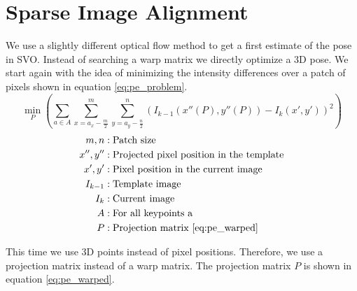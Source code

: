 \documentclass[11pt,a4paper,titlepage,oneside]{report}
\begin{document}
\section{Sparse Image Alignment}\label{sec:pose_estimation}
We use a slightly different optical flow method to get a first estimate of the pose in SVO. Instead of searching a warp matrix we directly optimize a 3D pose. We start again with the idea of minimizing the intensity differences over a patch of pixels shown in equation \ref{eq:pe_problem}.
\begin{equation}\label{eq:pe_problem}
  \min_P(\sum_{a \in A}\sum_{x=a_x-\frac{m}{2}}^m\sum_{y=a_y-\frac{n}{2}}^n(I_{k-1}(x''(P),y''(P))-I_{k}(x',y'))^2)
\end{equation}
\begin{align*}
  m,n       &: \text{Patch size}\\
  x'',y''   &: \text{Projected pixel position in the template}\\
  x',y'     &: \text{Pixel position in the current image}\\
  I_{k-1}   &: \text{Template image}\\
  I_{k}     &: \text{Current image}\\
  A         &: \text{For all keypoints a}\\
  P         &: \text{Projection matrix \ref{eq:pe_warped}}
\end{align*}

This time we use 3D points instead of pixel positions. Therefore, we use a projection matrix instead of a warp matrix. The projection matrix $P$ is shown in equation \ref{eq:pe_warped}. 
\end{document}
